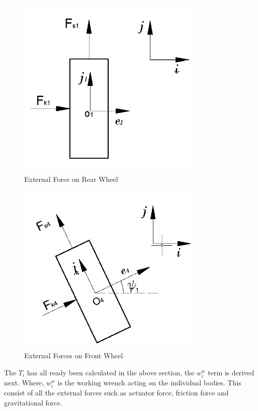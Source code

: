 {\begin{figure}
\begin{minipage}[t]{0.5\textwidth}
		\includegraphics[width=0.8\textwidth]{Chapter4/fig/ForceWheel1}
		\caption{External Force on Rear Wheel}\label{fig:ForceRearWheel}
	\end{minipage}
	\hfill
	\begin{minipage}[t]{0.5\textwidth}
		\centering
		\includegraphics[width=0.8\textwidth]{Chapter4/fig/ForceWheel2}
		\caption{External Forces on Front Wheel }\label{fig:ForceFrontWheel}
	\end{minipage}
\end{figure} 
The $T_i$ has all ready been calculated in the above section, the $w_i^w$ term is derived next. Where, $w_i^w$ is the working wrench acting on the individual bodies. This consist of all the external forces such as actuator force, friction force and gravitational force.
}
